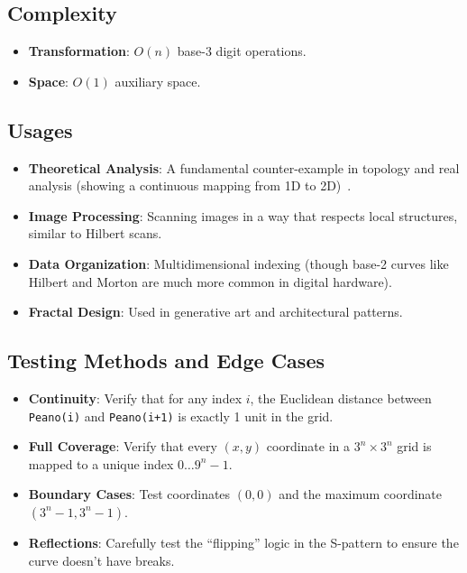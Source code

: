 \subsection{Complexity}
\begin{itemize}
    \item \textbf{Transformation}: $O(n)$ base-3 digit operations.
    \item \textbf{Space}: $O(1)$ auxiliary space.
\end{itemize}

\subsection{Usages}
\begin{itemize}
    \item \textbf{Theoretical Analysis}: A fundamental counter-example in topology and real analysis (showing a continuous mapping from 1D to 2D)~\cite{peano1890}.
    \item \textbf{Image Processing}: Scanning images in a way that respects local structures, similar to Hilbert scans.
    \item \textbf{Data Organization}: Multidimensional indexing (though base-2 curves like Hilbert and Morton are much more common in digital hardware).
    \item \textbf{Fractal Design}: Used in generative art and architectural patterns.
\end{itemize}

\subsection{Testing Methods and Edge Cases}
\begin{itemize}
    \item \textbf{Continuity}: Verify that for any index $i$, the Euclidean distance between \texttt{Peano(i)} and \texttt{Peano(i+1)} is exactly 1 unit in the grid.
    \item \textbf{Full Coverage}: Verify that every $(x, y)$ coordinate in a $3^n \times 3^n$ grid is mapped to a unique index $0 \dots 9^n - 1$.
    \item \textbf{Boundary Cases}: Test coordinates $(0,0)$ and the maximum coordinate $(3^n-1, 3^n-1)$.
    \item \textbf{Reflections}: Carefully test the ``flipping'' logic in the S-pattern to ensure the curve doesn't have breaks.
\end{itemize}

